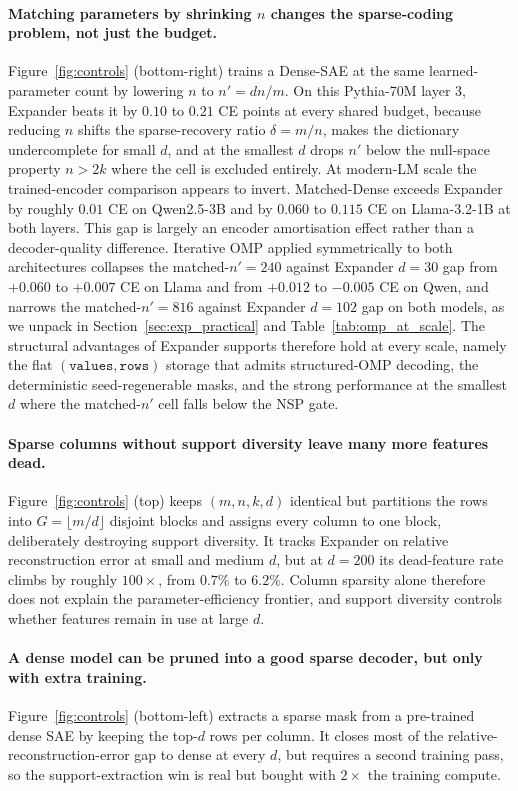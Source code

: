 \documentclass{article}
\theoremstyle{plain}
\theoremstyle{definition}
\theoremstyle{remark}
\begin{document}
\paragraph{Matching parameters by shrinking $n$ changes the sparse-coding problem, not just the budget.} Figure~\ref{fig:controls} (bottom-right) trains a Dense-SAE at the same learned-parameter count by lowering $n$ to $n' = dn/m$. On this Pythia-70M layer 3, Expander beats it by $0.10$ to $0.21$ CE points at every shared budget, because reducing $n$ shifts the sparse-recovery ratio $\delta = m/n$, makes the dictionary undercomplete for small $d$, and at the smallest $d$ drops $n'$ below the null-space property $n > 2k$ where the cell is excluded entirely. At modern-LM scale the trained-encoder comparison appears to invert. Matched-Dense exceeds Expander by roughly $0.01$ CE on Qwen2.5-3B and by $0.060$ to $0.115$ CE on Llama-3.2-1B at both layers. This gap is largely an encoder amortisation effect rather than a decoder-quality difference. Iterative OMP applied symmetrically to both architectures collapses the matched-$n'{=}240$ against Expander $d{=}30$ gap from $+0.060$ to $+0.007$ CE on Llama and from $+0.012$ to $-0.005$ CE on Qwen, and narrows the matched-$n'{=}816$ against Expander $d{=}102$ gap on both models, as we unpack in Section~\ref{sec:exp_practical} and Table~\ref{tab:omp_at_scale}. The structural advantages of Expander supports therefore hold at every scale, namely the flat $(\texttt{values}, \texttt{rows})$ storage that admits structured-OMP decoding, the deterministic seed-regenerable masks, and the strong performance at the smallest $d$ where the matched-$n'$ cell falls below the NSP gate.


\paragraph{Sparse columns without support diversity leave many more features dead.} Figure~\ref{fig:controls} (top) keeps $(m, n, k, d)$ identical but partitions the rows into $G = \lfloor m/d \rfloor$ disjoint blocks and assigns every column to one block, deliberately destroying support diversity. It tracks Expander on relative reconstruction error at small and medium $d$, but at $d{=}200$ its dead-feature rate climbs by roughly $100\times$, from $0.7\%$ to $6.2\%$. Column sparsity alone therefore does not explain the parameter-efficiency frontier, and support diversity controls whether features remain in use at large $d$.

\paragraph{A dense model can be pruned into a good sparse decoder, but only with extra training.} Figure~\ref{fig:controls} (bottom-left) extracts a sparse mask from a pre-trained dense SAE by keeping the top-$d$ rows per column. It closes most of the relative-reconstruction-error gap to dense at every $d$, but requires a second training pass, so the support-extraction win is real but bought with $2\times$ the training compute.
\end{document}

